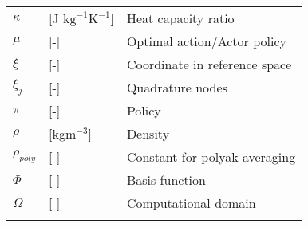 \begin{tabular}{lll}
   \vspace{1mm}
  $\kappa$              & [J $\text{kg}^{-1}\text{K}^{-1}$]             & Heat capacity ratio \\   
   \vspace{1mm}
   	   $\mu$              & [-]             & Optimal action/Actor policy\\ 
    \vspace{1mm}
   $\xi$              & [-]             & Coordinate in reference space \\
    \vspace{1mm}
   $\xi_j$              & [-]             & Quadrature nodes \\   
   \vspace{1mm} 
   $\pi$              & [-]             & Policy\\ 
   \vspace{1mm}
   $\rho$            & [kg$\text{m}^{-3}$]            & Density \\
       \vspace{1mm}
   $\rho_{poly}$              & [-]             & Constant for polyak averaging\\
       \vspace{1mm}    
   $\Phi$              & [-]             & Basis function \\
   \vspace{1mm}    
   $\Omega$              & [-]             & Computational domain \\ 
    \vspace{1mm}
\end{tabular}